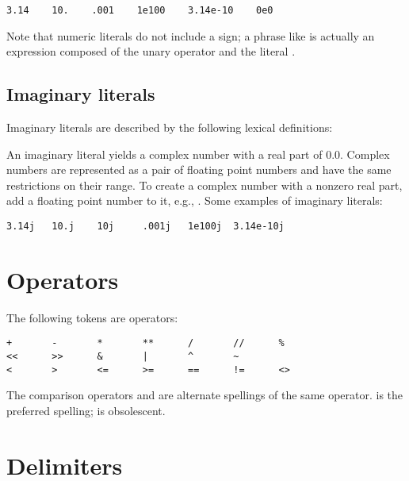 \begin{verbatim}
3.14    10.    .001    1e100    3.14e-10    0e0
\end{verbatim}

Note that numeric literals do not include a sign; a phrase like
 is actually an expression composed of the unary operator
\code{-} and the literal .


\subsection{Imaginary literals\label{imaginary}}

Imaginary literals are described by the following lexical definitions:

\begin{productionlist}
\end{productionlist}

An imaginary literal yields a complex number with a real part of
0.0.  Complex numbers are represented as a pair of floating point
numbers and have the same restrictions on their range.  To create a
complex number with a nonzero real part, add a floating point number
to it, e.g., .  Some examples of imaginary literals:

\begin{verbatim}
3.14j   10.j    10j     .001j   1e100j  3.14e-10j 
\end{verbatim}


\section{Operators\label{operators}}

The following tokens are operators:

\begin{verbatim}
+       -       *       **      /       //      %
<<      >>      &       |       ^       ~
<       >       <=      >=      ==      !=      <>
\end{verbatim}

The comparison operators \code{<>} and \code{!=} are alternate
spellings of the same operator.  \code{!=} is the preferred spelling;
\code{<>} is obsolescent.


\section{Delimiters\label{delimiters}}

